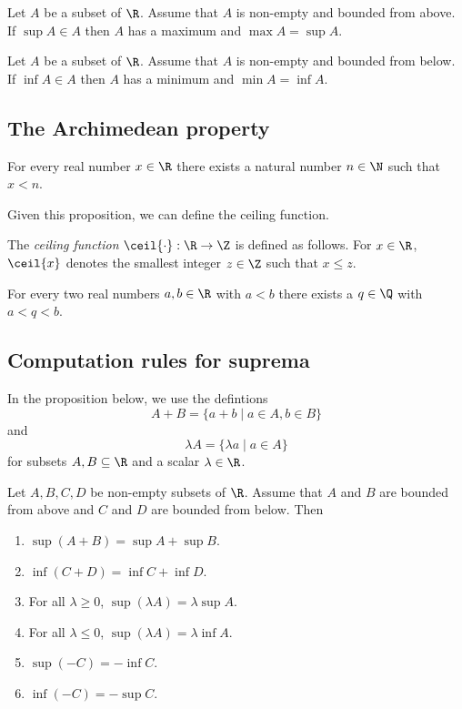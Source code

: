 \begin{proposition}
    Let $A$ be a subset of $\R$. Assume that $A$ is non-empty and bounded from above. If $\sup A \in A$ then $A$ has a maximum and $\max A = \sup A$.
\end{proposition}

\begin{proposition}
    Let $A$ be a subset of $\R$. Assume that $A$ is non-empty and bounded from below. If $\inf A \in A$ then $A$ has a minimum and $\min A = \inf A$.
\end{proposition}

\subsection{The Archimedean property}
\begin{proposition}
    For every real number $x \in \R$ there exists a natural number $n \in \N$ such that $x < n$.
\end{proposition}

Given this proposition, we can define the ceiling function.

\begin{definition}
    The \emph{ceiling function} $\ceil{\cdot}: \R \to \Z$ is defined as follows. For $x \in \R$, $\ceil{x}$ denotes the smallest integer $z \in \Z$ such that $x \le z$.
\end{definition}

\begin{proposition}
    For every two real numbers $a,b \in \R$ with $a < b$ there exists a $q \in \Q$ with $a < q < b$.
\end{proposition}

\subsection{Computation rules for suprema}
In the proposition below, we use the defintions
$$ A + B = \{a + b \mid a \in A, b \in B\}$$
and 
$$\lambda A = \{\lambda a \mid a \in A\}$$
for subsets $A,B \subseteq \R$ and a scalar $\lambda \in \R$.

\begin{proposition}
    Let $A,B,C,D$ be non-empty subsets of $\R$. Assume that $A$ and $B$ are bounded from above and $C$ and $D$ are bounded from below. Then
    \begin{enumerate}
        \item $\sup(A+B) = \sup A + \sup B$.
        \item $\inf(C+D) = \inf C + \inf D$.
        \item For all $\lambda \ge 0$, $\sup(\lambda A) = \lambda \sup A$.
        \item For all $\lambda \le 0$, $\sup(\lambda A) = \lambda \inf A$.
        \item $\sup(-C) = -\inf C$.
        \item $\inf(-C) = -\sup C$.
    \end{enumerate}
\end{proposition}

